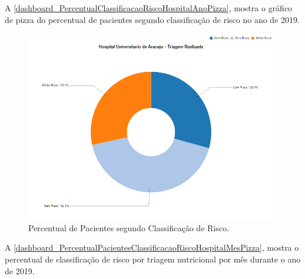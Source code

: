\newpage
A \autoref{dashboard_PercentualClassificacaoRiscoHospitalAnoPizza}, mostra o gráfico de pizza do percentual de pacientes segundo classificação de risco no ano de 2019.

\begin{figure}[htb]
	\caption{\label{dashboard_PercentualClassificacaoRiscoHospitalAnoPizza}Percentual de Pacientes segundo Classificação de Risco.}
	\begin{center}
	    \includegraphics[scale=0.6]{Imagens/2.1.PercentualPacientesClassificacaoRiscoHospitalAnoPizza.png}
	\end{center}
\end{figure}

\clearpage
A \autoref{dashboard_PercentualPacientesClassificacaoRiscoHospitalMesPizza}, mostra o percentual de classificação de risco por triagem nutricional por mês durante o ano de 2019.

